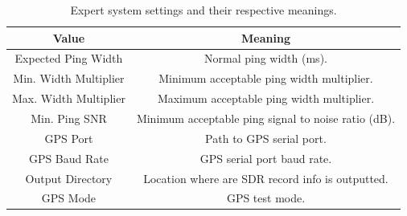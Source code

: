 \documentclass{report}
\begin{document}
			\begin{table}[htb]
			\centering
			\caption{Expert system settings and their respective meanings.}
			\begin{tabular}{||c c||}
			\hline
			Value & Meaning\\ [0.5ex]
			\hline\hline
			Expected Ping Width & Normal ping width (ms). \\
			\hline
			Min. Width Multiplier & Minimum acceptable ping width multiplier. \\
			\hline
			Max. Width Multiplier & Maximum acceptable ping width multiplier.\\
			\hline
			Min. Ping SNR & Minimum acceptable ping signal to noise ratio (dB). \\
			\hline
			GPS Port & Path to GPS serial port.\\
			\hline
			GPS Baud Rate & GPS serial port baud rate.\\
			\hline
			Output Directory & Location where are SDR record info is outputted.\\
			\hline
			GPS Mode & GPS test mode.\\ [1ex]
			\hline
			\end{tabular}
			\end{table}
\end{document}

